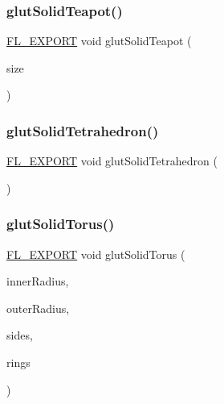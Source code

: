 \subsubsection{\texorpdfstring{glut\+Solid\+Teapot()}{glutSolidTeapot()}}
{\footnotesize\ttfamily \hyperlink{_fl___export_8_h_aa9ba29a18aee9d738370a06eeb4470fc}{F\+L\+\_\+\+E\+X\+P\+O\+RT} void glut\+Solid\+Teapot (\begin{DoxyParamCaption}\item[{G\+Ldouble}]{size }\end{DoxyParamCaption})}

\mbox{\label{glut_8_h_a3c414e842728a541fabde204d23f10bd}} 
\subsubsection{\texorpdfstring{glut\+Solid\+Tetrahedron()}{glutSolidTetrahedron()}}
{\footnotesize\ttfamily \hyperlink{_fl___export_8_h_aa9ba29a18aee9d738370a06eeb4470fc}{F\+L\+\_\+\+E\+X\+P\+O\+RT} void glut\+Solid\+Tetrahedron (\begin{DoxyParamCaption}{ }\end{DoxyParamCaption})}

\mbox{\label{glut_8_h_a34d2d63626f7bdda5581030ab98ceef9}} 
\subsubsection{\texorpdfstring{glut\+Solid\+Torus()}{glutSolidTorus()}}
{\footnotesize\ttfamily \hyperlink{_fl___export_8_h_aa9ba29a18aee9d738370a06eeb4470fc}{F\+L\+\_\+\+E\+X\+P\+O\+RT} void glut\+Solid\+Torus (\begin{DoxyParamCaption}\item[{G\+Ldouble}]{inner\+Radius,  }\item[{G\+Ldouble}]{outer\+Radius,  }\item[{G\+Lint}]{sides,  }\item[{G\+Lint}]{rings }\end{DoxyParamCaption})}

\mbox{\label{glut_8_h_aec9c84689e232415d9c54e3056605cde}} 
